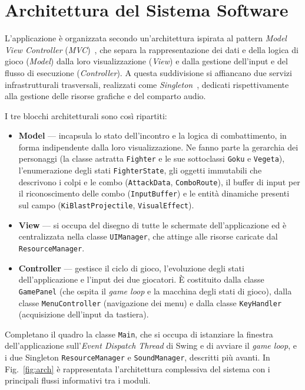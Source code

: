 \documentclass[12pt,a4paper]{report}
\begin{document}
\section{Architettura del Sistema Software}\label{ch:arch}
L'applicazione è organizzata secondo un'architettura ispirata al pattern \emph{Model View Controller} (\emph{MVC})~\cite{mvc}, che separa la rappresentazione dei dati e della logica di gioco (\emph{Model}) dalla loro visualizzazione (\emph{View}) e dalla gestione dell'input e del flusso di esecuzione (\emph{Controller}). A questa suddivisione si affiancano due servizi infrastrutturali trasversali, realizzati come \emph{Singleton}~\cite{gof}, dedicati rispettivamente alla gestione delle risorse grafiche e del comparto audio.

I tre blocchi architetturali sono così ripartiti:
\begin{itemize}
  \item \textbf{Model} --- incapsula lo stato dell'incontro e la logica di combattimento, in forma indipendente dalla loro visualizzazione. Ne fanno parte la gerarchia dei personaggi (la classe astratta \texttt{Fighter} e le sue sottoclassi \texttt{Goku} e \texttt{Vegeta}), l'enumerazione degli stati \texttt{FighterState}, gli oggetti immutabili che descrivono i colpi e le combo (\texttt{AttackData}, \texttt{ComboRoute}), il buffer di input per il riconoscimento delle combo (\texttt{InputBuffer}) e le entità dinamiche presenti sul campo (\texttt{KiBlastProjectile}, \texttt{VisualEffect}).
  \item \textbf{View} --- si occupa del disegno di tutte le schermate dell'applicazione ed è centralizzata nella classe \texttt{UIManager}, che attinge alle risorse caricate dal \texttt{ResourceManager}.
  \item \textbf{Controller} --- gestisce il ciclo di gioco, l'evoluzione degli stati dell'applicazione e l'input dei due giocatori. È costituito dalla classe \texttt{GamePanel} (che ospita il \emph{game loop} e la macchina degli stati di gioco), dalla classe \texttt{MenuController} (navigazione dei menu) e dalla classe \texttt{KeyHandler} (acquisizione dell'input da tastiera).
\end{itemize}

Completano il quadro la classe \texttt{Main}, che si occupa di istanziare la finestra dell'applicazione sull'\emph{Event Dispatch Thread} di Swing e di avviare il \emph{game loop}, e i due Singleton \texttt{ResourceManager} e \texttt{SoundManager}, descritti più avanti. In Fig.~\ref{fig:arch} è rappresentata l'architettura complessiva del sistema con i principali flussi informativi tra i moduli.
\end{document}
